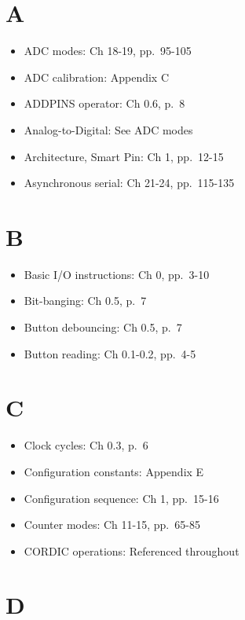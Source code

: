 \documentclass[11pt,a4paper,oneside,english]{book}
\begin{document}
\hypertarget{a}{%
\section{A}\label{a}}

\begin{itemize}
\tightlist
\item
  ADC modes: Ch 18-19, pp.~95-105
\item
  ADC calibration: Appendix C
\item
  ADDPINS operator: Ch 0.6, p.~8
\item
  Analog-to-Digital: See ADC modes
\item
  Architecture, Smart Pin: Ch 1, pp.~12-15
\item
  Asynchronous serial: Ch 21-24, pp.~115-135
\end{itemize}

\hypertarget{b}{%
\section{B}\label{b}}

\begin{itemize}
\tightlist
\item
  Basic I/O instructions: Ch 0, pp.~3-10
\item
  Bit-banging: Ch 0.5, p.~7
\item
  Button debouncing: Ch 0.5, p.~7
\item
  Button reading: Ch 0.1-0.2, pp.~4-5
\end{itemize}

\hypertarget{c}{%
\section{C}\label{c}}

\begin{itemize}
\tightlist
\item
  Clock cycles: Ch 0.3, p.~6
\item
  Configuration constants: Appendix E
\item
  Configuration sequence: Ch 1, pp.~15-16
\item
  Counter modes: Ch 11-15, pp.~65-85
\item
  CORDIC operations: Referenced throughout
\end{itemize}

\hypertarget{d}{%
\section{D}\label{d}}
\end{document}
